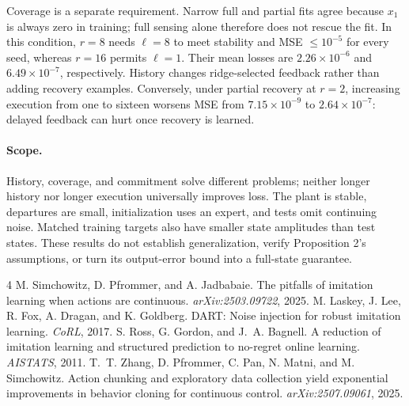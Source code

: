 \documentclass{l4dc2026}
\begin{document}
Coverage is a separate requirement. Narrow full and partial fits agree because $x_1$ is always zero in training; full sensing alone therefore does not rescue the fit. In this condition, $r=8$ needs $\ell=8$ to meet stability and MSE $\le10^{-5}$ for every seed, whereas $r=16$ permits $\ell=1$. Their mean losses are $2.26\times10^{-6}$ and $6.49\times10^{-7}$, respectively. History changes ridge-selected feedback rather than adding recovery examples. Conversely, under partial recovery at $r=2$, increasing execution from one to sixteen worsens MSE from $7.15\times10^{-9}$ to $2.64\times10^{-7}$: delayed feedback can hurt once recovery is learned.

\paragraph{Scope.}
History, coverage, and commitment solve different problems; neither longer history nor longer execution universally improves loss. The plant is stable, departures are small, initialization uses an expert, and tests omit continuing noise. Matched training targets also have smaller state amplitudes than test states. These results do not establish generalization, verify Proposition 2's assumptions, or turn its output-error bound into a full-state guarantee.

\footnotesize
\begin{thebibliography}{4}\setlength{\itemsep}{1pt}
 M. Simchowitz, D. Pfrommer, and A. Jadbabaie. The pitfalls of imitation learning when actions are continuous. \emph{arXiv:2503.09722}, 2025.
 M. Laskey, J. Lee, R. Fox, A. Dragan, and K. Goldberg. DART: Noise injection for robust imitation learning. \emph{CoRL}, 2017.
 S. Ross, G. Gordon, and J.~A. Bagnell. A reduction of imitation learning and structured prediction to no-regret online learning. \emph{AISTATS}, 2011.
 T.~T. Zhang, D. Pfrommer, C. Pan, N. Matni, and M. Simchowitz. Action chunking and exploratory data collection yield exponential improvements in behavior cloning for continuous control. \emph{arXiv:2507.09061}, 2025.
\end{thebibliography}
\end{document}
